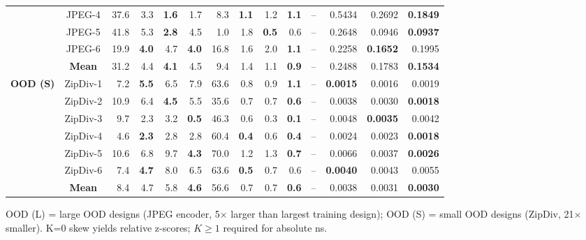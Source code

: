 \documentclass[acmsmall,review,anonymous]{acmart}
\begin{document}
\begin{table}[t]
\begin{tabular}{|c|c|rrrr|rrrr|rrrr|}
 & JPEG-4    & 37.6 & 3.3 & \textbf{1.6} & 1.7 &  8.3 & \textbf{1.1} & 1.2 & \textbf{1.1} & -- & 0.5434 & 0.2692 & \textbf{0.1849} \\
 & JPEG-5    & 41.8 & 5.3 & \textbf{2.8} & 4.5 &  1.0 & 1.8 & \textbf{0.5} & 0.6 & -- & 0.2648 & 0.0946 & \textbf{0.0937} \\
 & JPEG-6    & 19.9 & \textbf{4.0} & 4.7 & \textbf{4.0} & 16.8 & 1.6 & 2.0 & \textbf{1.1} & -- & 0.2258 & \textbf{0.1652} & 0.1995 \\ \cline{2-14}
 & \textbf{Mean} & 31.2 & 4.4 & \textbf{4.1} & 4.5 &  9.4 & 1.4 & 1.1 & \textbf{0.9} & -- & 0.2488 & 0.1783 & \textbf{0.1534} \\ \hline
\multirow{7}{*}{\textbf{OOD (S)}}
 & ZipDiv-1  &  7.2 & \textbf{5.5} & 6.5 & 7.9 & 63.6 & 0.8 & 0.9 & \textbf{1.1} & -- & \textbf{0.0015} & 0.0016 & 0.0019 \\
 & ZipDiv-2  & 10.9 & 6.4 & \textbf{4.5} & 5.5 & 35.6 & 0.7 & 0.7 & \textbf{0.6} & -- & 0.0038 & 0.0030 & \textbf{0.0018} \\
 & ZipDiv-3  &  9.7 & 2.3 & 3.2 & \textbf{0.5} & 46.3 & 0.6 & 0.3 & \textbf{0.1} & -- & 0.0048 & \textbf{0.0035} & 0.0042 \\
 & \cellcolor{bestrow}ZipDiv-4 & \cellcolor{bestrow}4.6 & \cellcolor{bestrow}\textbf{2.3} & \cellcolor{bestrow}2.8 & \cellcolor{bestrow}2.8
   & \cellcolor{bestrow}60.4 & \cellcolor{bestrow}\textbf{0.4} & \cellcolor{bestrow}0.6 & \cellcolor{bestrow}\textbf{0.4}
   & \cellcolor{bestrow}-- & \cellcolor{bestrow}0.0024 & \cellcolor{bestrow}0.0023 & \cellcolor{bestrow}\textbf{0.0018} \\
 & ZipDiv-5  & 10.6 & 6.8 & 9.7 & \textbf{4.3} & 70.0 & 1.2 & 1.3 & \textbf{0.7} & -- & 0.0066 & 0.0037 & \textbf{0.0026} \\
 & ZipDiv-6  &  7.4 & \textbf{4.7} & 8.0 & 6.5 & 63.6 & \textbf{0.5} & 0.7 & 0.6 & -- & \textbf{0.0040} & 0.0043 & 0.0055 \\ \cline{2-14}
 & \textbf{Mean} & 8.4 & 4.7 & 5.8 & \textbf{4.6} & 56.6 & 0.7 & 0.7 & \textbf{0.6} & -- & 0.0038 & 0.0031 & \textbf{0.0030} \\ \hline
\end{tabular}
\vspace{1mm}
\begin{minipage}{\linewidth}
\small OOD (L) = large OOD designs (JPEG encoder, 5$\times$ larger than
  largest training design); OOD (S) = small OOD designs (ZipDiv, 21$\times$
  smaller). K=0 skew yields relative z-scores; $K\geq1$ required for
  absolute ns.
\end{minipage}
\end{table}
\end{document}
